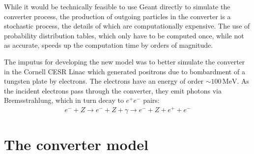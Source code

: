 \documentclass[12pt]{article}
\newcommand{\MeV}{\, \mathrm{MeV}}
\begin{document}
While it would be technically feasible to use Geant directly to simulate the converter process, the
production of outgoing particles in the converter is a stochastic process, the details of which are
computationally expensive. The use of probability distribution tables, which only have to be
computed once, while not as accurate, speeds up the computation time by orders of magnitude.

The imputus for developing the new model was to better simulate the converter in the Cornell CESR
Linac which generated positrons due to bombardment of a tungsten plate by electrons. The electrons
have an energy of order $\sim 100 \MeV$.  As the incident electrons pass through the
converter, they emit photons via Bremsstrahlung, which in turn decay to $e^+ e^-$ pairs:
\begin{align}
  e^- + Z \rightarrow e^- + Z + \gamma \rightarrow e^- + Z + e^+ + e^-
\end{align}

\section{The converter model}
\end{document}
